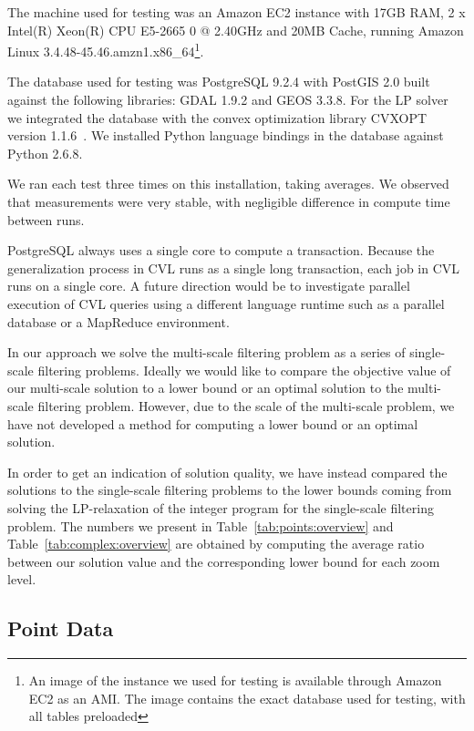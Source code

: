 The machine used for testing was an Amazon EC2 instance with 17GB RAM, 2 x Intel(R) Xeon(R) CPU E5-2665 0 @ 2.40GHz and 20MB Cache, running Amazon Linux 3.4.48-45.46.amzn1.x86\_64\footnote{An image of the instance we used for testing is available through Amazon EC2 as an AMI. The image contains the exact database used for testing, with all tables preloaded}.

The database used for testing was PostgreSQL 9.2.4 with PostGIS  2.0 built against the following libraries: GDAL 1.9.2 and GEOS 3.3.8. For the LP solver we integrated the database with the convex optimization library CVXOPT version 1.1.6~\cite{cvxopt}. We installed Python language bindings in the database against Python 2.6.8.

We ran each test three times on this installation, taking averages. We observed that measurements were very stable, with negligible difference in compute time between runs.

PostgreSQL always uses a single core to compute a transaction. Because the generalization process in CVL runs as a single long transaction, each job in CVL runs on a single core. A future direction would be to investigate parallel execution of CVL queries using a different language runtime such as a parallel database or a MapReduce environment.


In our approach we solve the multi-scale filtering problem as a series of single-scale filtering problems. Ideally we would like to compare the objective value of our multi-scale solution to a lower bound or an optimal solution to the multi-scale filtering problem. However, due to the scale of the multi-scale problem, we have not developed a method for computing a lower bound or an optimal solution.

In order to get an indication of solution quality, we have instead compared the solutions to the single-scale filtering problems to the lower bounds coming from solving the LP-relaxation of the integer program for the single-scale filtering problem. The numbers we present in Table~\ref{tab:points:overview} and Table~\ref{tab:complex:overview} are obtained by computing the average ratio between our solution value and the corresponding lower bound for each zoom level. 

\subsection{Point Data}
\label{sec:exp:points}

